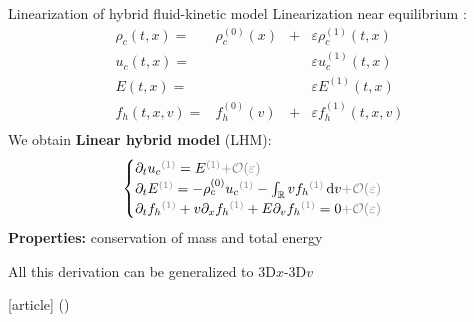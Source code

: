 \documentclass{beamer}
\newcommand{\cmark}{{\color{dgreen}\ding{52}}}
\newcommand{\mbold}[1]{{\textbf{\color{PLB}#1}}}
\newcommand{\customcite}[1]{\citeauthor{#1} (\citeyear{#1})}
\begin{document}
\begin{frame}{Linearization of hybrid fluid-kinetic model}
  Linearization near equilibrium :
  $$
    \begin{aligned}
      \rho_c(t,x)   =& \rho_c^{(0)}(x) & + & \varepsilon \rho_c^{(1)}(t,x) \\
         u_c(t,x)   =&                 &   & \varepsilon  u_c^{(1)}(t,x) \\
           E(t,x)   =&                 &   & \varepsilon  E^{(1)}(t,x) \\
         f_h(t,x,v) =& f_h^{(0)}(v)    & + & \varepsilon  f_h^{(1)}(t,x,v) \\
    \end{aligned}
  $$
  We obtain \mbold{Linear hybrid model} (LHM):
  $$
    \begin{cases}
      \partial_tu_c{\color{gris}^{(1)}}  = E{\color{gris}^{(1)}}  {\color{gris}+ \mathcal{O}(\varepsilon)} \\
      \partial_tE{\color{gris}^{(1)}}    = -\rho_c^{(0)}u_c{\color{gris}^{(1)}} - \int_\mathbb{R}vf_h{\color{gris}^{(1)}}\,\mathrm{d}v {\color{gris}+ \mathcal{O}(\varepsilon)}\\
      \partial_tf_h{\color{gris}^{(1)}}  + v\partial_xf_h{\color{gris}^{(1)}} + E\partial_vf_h{\color{gris}^{(1)}} = 0 {\color{gris}+ \mathcal{O}(\varepsilon)}
    \end{cases}
  $$
  \mbold{Properties:} conservation of mass and total energy \cmark

  All this derivation can be generalized to 3D$x$-3D$v$ \begin{thebibliography}{9}
    [article]
     \customcite{Holderied:2020}
  \end{thebibliography}
\end{frame}
\end{document}
